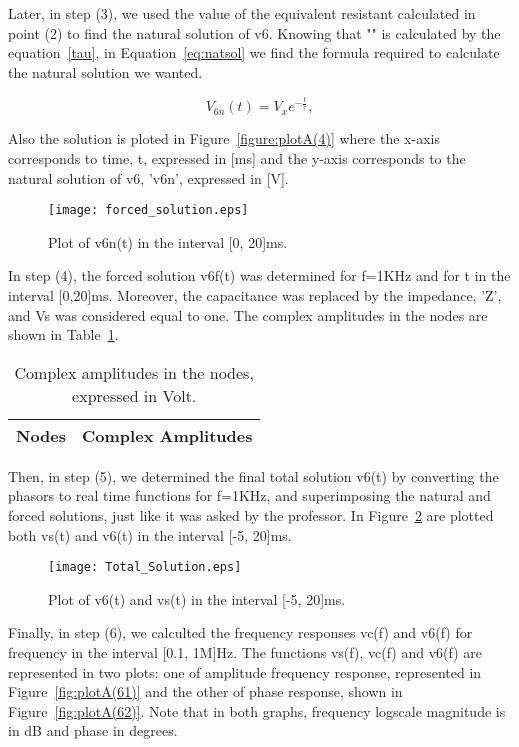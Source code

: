 Later, in step (3), we used the value of the equivalent resistant calculated in point (2) to find the natural solution of v6. Knowing that "\tau" is calculated by the equation~\ref{tau}, in Equation~\ref{eq:natsol} we find the formula required to calculate the natural solution we wanted. 

\begin{equation}
  V_{6n}(t) = V_{x}e^{-\frac{t}{\tau}},
  \label{eq:natsol}
\end{equation}

Also the solution is ploted in Figure~\ref{figure:plotA(4)} where the x-axis corresponds to time, t, expressed in [ms] and the y-axis corresponds to the natural solution of v6, 'v6n', expressed in [V].

\begin{figure}[h] \centering
\texttt{[image: forced\_solution.eps]}
\caption{Plot of v6n(t) in the interval [0, 20]ms.}
\label{fig:plotA(4)}
\end{figure}

In step (4), the forced solution v6f(t) was determined for f=1KHz and for t in the interval [0,20]ms. Moreover, the capacitance was replaced by the impedance, 'Z', and Vs was considered equal to one. The complex amplitudes in the nodes are shown in Table~\ref{tab:TA4}.

\begin{table}[h]
  \centering
  \begin{tabular}{|l|r|}
    \hline    
    {\bf Nodes} & {\bf Complex Amplitudes} \\ \hline
    
  \end{tabular}
  \caption{Complex amplitudes in the nodes, expressed in Volt.}
  \label{tab:TA4}
\end{table}

Then, in step (5), we determined the final total solution v6(t) by converting the phasors to real time functions for f=1KHz, and superimposing the natural and forced solutions, just like it was asked by the professor. In Figure~\ref{fig:plotA(5)} are plotted both vs(t) and v6(t) in the interval [-5, 20]ms.

\begin{figure}[h] \centering
\texttt{[image: Total\_Solution.eps]}
\caption{Plot of v6(t) and vs(t) in the interval [-5, 20]ms.}
\label{fig:plotA(5)}
\end{figure}

Finally, in step (6), we calculted the frequency responses vc(f) and v6(f) for frequency in the interval [0.1, 1M]Hz. The functions vs(f), vc(f) and v6(f) are represented in two plots: one of amplitude frequency response, represented in Figure~\ref{fig:plotA(61)} and the other of phase response, shown in Figure~\ref{fig:plotA(62)}. Note that in both graphs, frequency logscale magnitude is in dB and phase in degrees.

